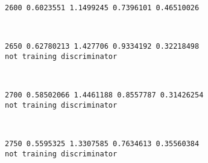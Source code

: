\documentclass[11pt]{article}
\begin{document}
    \begin{Verbatim}[commandchars=\\\{\}]
2600 0.6023551 1.1499245 0.7396101 0.46510026

    \end{Verbatim}

    \begin{center}
    \end{center}
    { \hspace*{\fill} \\}
    
    \begin{Verbatim}[commandchars=\\\{\}]
2650 0.62780213 1.427706 0.9334192 0.32218498
not training discriminator

    \end{Verbatim}

    \begin{center}
    \end{center}
    { \hspace*{\fill} \\}
    
    \begin{Verbatim}[commandchars=\\\{\}]
2700 0.58502066 1.4461188 0.8557787 0.31426254
not training discriminator

    \end{Verbatim}

    \begin{center}
    \end{center}
    { \hspace*{\fill} \\}
    
    \begin{Verbatim}[commandchars=\\\{\}]
2750 0.5595325 1.3307585 0.7634613 0.35560384
not training discriminator

    \end{Verbatim}

    \begin{center}
    \end{center}
    { \hspace*{\fill} \\}
    
\end{document}
